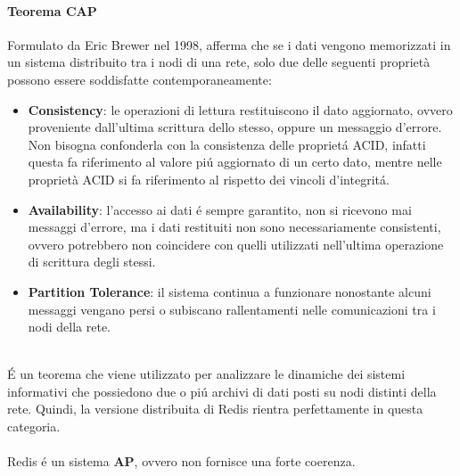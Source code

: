 \paragraph{Teorema CAP\\}
Formulato da Eric Brewer nel 1998, afferma che se i dati vengono memorizzati in un sistema distribuito tra i nodi di una rete, solo due delle seguenti
proprietà possono essere soddisfatte contemporaneamente:
\begin{itemize}
    \item \textbf{Consistency}: le operazioni di lettura restituiscono il dato aggiornato, ovvero proveniente dall'ultima scrittura dello stesso,
    oppure un messaggio d'errore. Non bisogna confonderla con la consistenza delle proprietá ACID, infatti questa fa riferimento al valore piú aggiornato
    di un certo dato, mentre nelle proprietà ACID si fa riferimento al rispetto dei vincoli d'integritá.
    \item \textbf{Availability}: l'accesso ai dati é sempre garantito, non si ricevono mai messaggi d'errore, ma i dati restituiti non sono necessariamente
    consistenti, ovvero potrebbero non coincidere con quelli utilizzati nell'ultima operazione di scrittura degli stessi.
    \item \textbf{Partition Tolerance}: il sistema continua a funzionare nonostante alcuni messaggi vengano persi o subiscano rallentamenti
    nelle comunicazioni tra i nodi della rete.
\end{itemize}
\\
É un teorema che viene utilizzato per analizzare le dinamiche dei sistemi informativi che possiedono due o piú archivi di dati posti su
nodi distinti della rete. Quindi, la versione distribuita di Redis rientra perfettamente in questa categoria.\\
\\
Redis é un sistema \textbf{AP}, ovvero non fornisce una forte coerenza.
